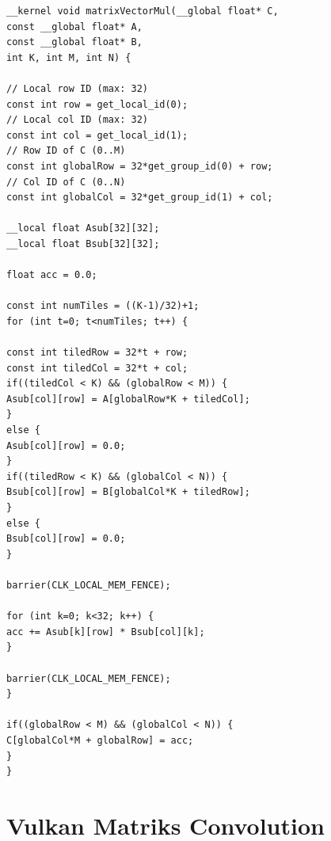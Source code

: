 \begin{lstlisting}[frame=single]
__kernel void matrixVectorMul(__global float* C, 
const __global float* A, 
const __global float* B, 
int K, int M, int N) { 

// Local row ID (max: 32)
const int row = get_local_id(0);
// Local col ID (max: 32)  
const int col = get_local_id(1);
// Row ID of C (0..M)  
const int globalRow = 32*get_group_id(0) + row; 
// Col ID of C (0..N) 
const int globalCol = 32*get_group_id(1) + col;  

__local float Asub[32][32]; 
__local float Bsub[32][32]; 

float acc = 0.0; 

const int numTiles = ((K-1)/32)+1; 
for (int t=0; t<numTiles; t++) { 

const int tiledRow = 32*t + row; 
const int tiledCol = 32*t + col; 
if((tiledCol < K) && (globalRow < M)) {
Asub[col][row] = A[globalRow*K + tiledCol]; 
}  
else {   
Asub[col][row] = 0.0; 
}  
if((tiledRow < K) && (globalCol < N)) {
Bsub[col][row] = B[globalCol*K + tiledRow]; 
}  
else {   
Bsub[col][row] = 0.0; 
}  

barrier(CLK_LOCAL_MEM_FENCE); 

for (int k=0; k<32; k++) { 
acc += Asub[k][row] * Bsub[col][k]; 
} 

barrier(CLK_LOCAL_MEM_FENCE); 
} 

if((globalRow < M) && (globalCol < N)) { 
C[globalCol*M + globalRow] = acc; 
}
}
\end{lstlisting}

\section{Vulkan Matriks Convolution}
